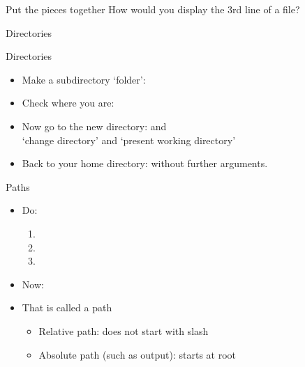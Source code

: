 \documentclass[11pt,headernav]{beamer}
\begin{document}


\begin{exercise}{Put the pieces together}
  How would you display the 3rd line of a file?
\end{exercise}

 {Directories}

\begin{numberedframe}{Directories}
  \label{sl-lnx:cd}
  \begin{itemize}
  \item Make a subdirectory `folder': 
  \item Check where you are: 
  \item Now go to the new directory:  and \\
    `change directory' and `present working directory'
  \item Back to your home directory:  without further arguments.
  \end{itemize}
\end{numberedframe}


\begin{numberedframe}{Paths}
  \label{sl-lnx:path}
  \begin{itemize}
  \item Do:
    \begin{enumerate}
    \item {} \item {} \item {}
    \end{enumerate}
  \item Now: 
  \item That is called a path
    \begin{itemize}
    \item Relative path: does not start with slash
    \item Absolute path (such as  output): starts at root
    \end{itemize}
  \end{itemize}
\end{numberedframe}
\end{document}
